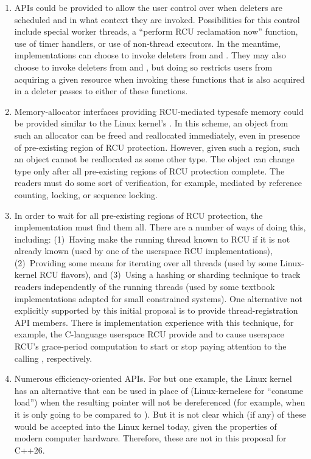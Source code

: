 \begin{enumerate}
\item	APIs could be provided to allow the user control over when
	deleters are scheduled and in what context they are invoked.
	Possibilities for this control include special worker threads,
	a ``perform RCU reclamation now'' function, use of timer handlers,
	or use of non-thread executors.
	In the meantime, implementations can choose to invoke deleters
	from  and .
	They may also choose to invoke deleters from 
	and , but doing so restricts users from
	acquiring a given resource when invoking these functions that
	is also acquired in a deleter passes to either of these functions.
\item	Memory-allocator interfaces providing RCU-mediated typesafe
	memory could be provided similar to the Linux kernel's
	.
	In this scheme, an object from such an allocator can be freed
	and reallocated immediately, even in presence of pre-existing
	region of RCU protection.
	However, given such a region, such an object cannot be reallocated
	as some other type.
	The object can change type only after all pre-existing regions
	of RCU protection complete.
	The readers must do some sort of verification, for example,
	mediated by reference counting, locking, or sequence locking.
\item	In order to wait for all pre-existing regions of RCU protection,
	the implementation must find them all.
	There are a number of ways of doing this, including:
	(1)~Having  make the running thread known
	to RCU if it is not already known (used by one of the userspace
	RCU implementations),
	(2)~Providing some means for iterating over all threads (used
	by some Linux-kernel RCU flavors), and
	(3)~Using a hashing or sharding technique to track readers
	independently of the running threads (used by some textbook
	implementations adapted for small constrained systems).
	One alternative not explicitly supported by this initial
	proposal is to provide thread-registration API members.
	There is implementation experience with this technique,
	for example, the C-language userspace RCU provide
	 and 
	to cause userspace RCU's grace-period computation to start
	or stop paying attention to the calling ,
	respectively.
\item	Numerous efficiency-oriented APIs.
	For but one example, the Linux kernel has an alternative
	 that can be used in place
	of  (Linux-kernelese for ``consume load'')
	when the resulting pointer will not be dereferenced
	(for example, when it is only going to be compared to ).
	But it is not clear which (if any) of these would be accepted
	into the Linux kernel today, given the properties of modern
	computer hardware.
	Therefore, these are not in this proposal for C++26.
\end{enumerate}

